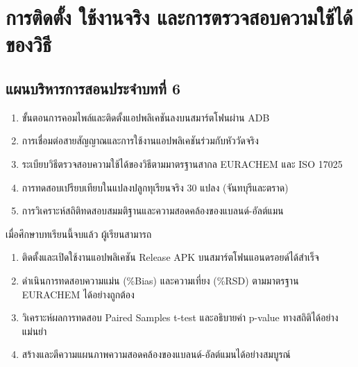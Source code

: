 \chapter{การติดตั้ง ใช้งานจริง และการตรวจสอบความใช้ได้ของวิธี}
\label{chap:ch06}

\section*{แผนบริหารการสอนประจำบทที่ 6}

\begin{tcolorbox}[
    enhanced, breakable,
    colback=white, colframe=rbruNavy,
    fonttitle=\bfseries\color{white},
    title={1. หัวข้อเนื้อหาประจำบท},
    arc=1.5mm, boxrule=0.8pt, leftrule=3.5mm
]
\begin{enumerate}
    \item ขั้นตอนการคอมไพล์และติดตั้งแอปพลิเคชันลงบนสมาร์ตโฟนผ่าน ADB
    \item การเชื่อมต่อสายสัญญาณและการใช้งานแอปพลิเคชันร่วมกับหัววัดจริง
    \item ระเบียบวิธีตรวจสอบความใช้ได้ของวิธีตามมาตรฐานสากล EURACHEM และ ISO 17025
    \item การทดสอบเปรียบเทียบในแปลงปลูกทุเรียนจริง 30 แปลง (จันทบุรีและตราด)
    \item การวิเคราะห์สถิติทดสอบสมมติฐานและความสอดคล้องของแบลนด์-อัลต์แมน
\end{enumerate}
\end{tcolorbox}

\begin{tcolorbox}[
    enhanced, breakable,
    colback=white, colframe=rbruNavy,
    fonttitle=\bfseries\color{white},
    title={2. วัตถุประสงค์เชิงพฤติกรรม},
    arc=1.5mm, boxrule=0.8pt, leftrule=3.5mm
]
เมื่อศึกษาบทเรียนนี้จบแล้ว ผู้เรียนสามารถ
\begin{enumerate}
    \item ติดตั้งและเปิดใช้งานแอปพลิเคชัน Release APK บนสมาร์ตโฟนแอนดรอยด์ได้สำเร็จ
    \item ดำเนินการทดสอบความแม่น (\%Bias) และความเที่ยง (\%RSD) ตามมาตรฐาน EURACHEM ได้อย่างถูกต้อง
    \item วิเคราะห์ผลการทดสอบ Paired Samples t-test และอธิบายค่า p-value ทางสถิติได้อย่างแม่นยำ
    \item สร้างและตีความแผนภาพความสอดคล้องของแบลนด์-อัลต์แมนได้อย่างสมบูรณ์
\end{enumerate}
\end{tcolorbox}

